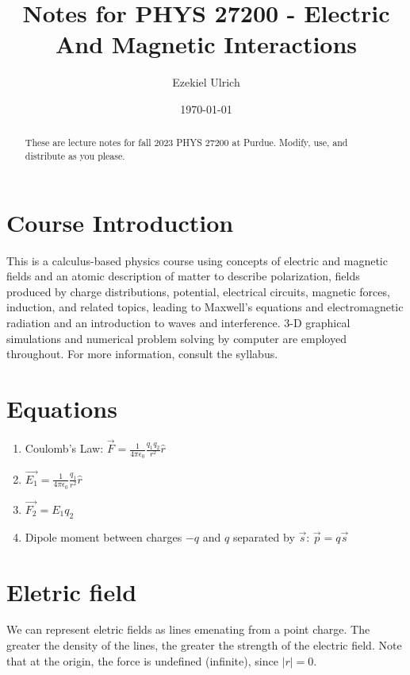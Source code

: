 \documentclass[nobib]{tufte-handout}
\title{Notes for PHYS 27200 - Electric And Magnetic Interactions}
\author[Ezekiel Ulrich]{Ezekiel Ulrich}
\date{\today}  %
\begin{document}
\maketitle

\begin{abstract}
These are lecture notes for fall 2023 PHYS 27200 at Purdue. Modify, use, and distribute as you please.
\end{abstract}

\tableofcontents

\section{Course Introduction}

This is a calculus-based physics course using concepts of electric and magnetic fields and an atomic description of
matter to describe polarization, fields produced by charge distributions, potential, electrical circuits,
magnetic forces, induction, and related topics, leading to Maxwell's equations and electromagnetic
radiation and an introduction to waves and interference. 3-D graphical simulations and numerical problem
solving by computer are employed throughout. For more information, consult the syllabus.

\section{Equations}

\begin{enumerate}
    \item Coulomb's Law: $\vec{F} = \frac{1}{4\pi \epsilon_0}\frac{q_1 q_2}{r^2}\hat{r}$
    \item $\vec{E_1} = \frac{1}{4\pi \epsilon_0}\frac{q_1}{r^2}\hat{r}$
    \item $\vec{F_2} = E_1 q_2$
    \item Dipole moment between charges $-q$ and $q$ separated by $\vec{s}$: $\vec{p} = q\vec{s}$

\end{enumerate}

\section{Eletric field}

We can represent eletric fields as lines emenating from a point charge. The greater the density of the lines, the greater 
the strength of the electric field. Note that at the origin, the force is
undefined (infinite), since $|r| = 0$. 
\end{document}
